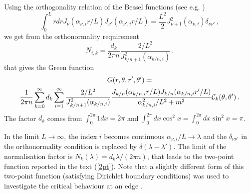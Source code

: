 \documentclass[12pt,aps]{revtex4}
\begin{document}
Using the orthogonality relation of the Bessel functions (see e.g. \cite{as})
$$
\int_0^L r dr J_\nu(\alpha_{\nu,i} r/L)J_{\nu'}(\alpha_{\nu',i} r/L)=
\frac{L^2}{2}J^2_{\nu+1}(\alpha_{\nu,i})\delta_{\nu\nu'}\,,
$$
we get from the orthonormality requirement
$$
N_{i,k}=\frac{d_k}{2\pi n}\frac{2/L^2}{J^2_{k/n+1}(\alpha_{k/n,i})}\,.
$$
that gives the Green function
\begin{multline}
G(r,\theta,r',\theta')=\\
\frac{1}{2\pi n} \sum_{k=0}^\infty d_k \sum_{i=1}^\infty
\frac{2/L^2}{J_{k/n+1}^2(\alpha_{k/n,i})}
\frac{J_{k/n}(\alpha_{k/n,i}r/L)J_{k/n}(\alpha_{k/n,i}r'/L)}{\alpha_{k/n,i}^2/L^2+m^2}
{\cal C}_k(\theta,\theta')\,.
\label{2ptL}
\end{multline}
The factor $d_k$ comes from $\int_0^{2\pi} 1dx =2\pi$ and
$\int_0^{2\pi}dx  \cos^2  x= \int_0^{2\pi}dx  \sin^2  x  =\pi$.


In the limit $L\rightarrow\infty$, the index $i$ becomes
continuous $\alpha_{\nu,i}/L\rightarrow\lambda$ and the $\delta_{\nu\nu'}$
in the orthonormality condition is replaced by $\delta(\lambda-\lambda')$.
The limit of the normalisation factor is $N_k(\lambda)=d_k\lambda/(2\pi n)$,
that leads to the two-point function reported in the text (\ref{2pt}).
Note that a slightly different form of this two-point function
(satisfying Dirichlet boundary conditions) was used to investigate
the critical behaviour at an edge \cite{c-83}.
\end{document}
